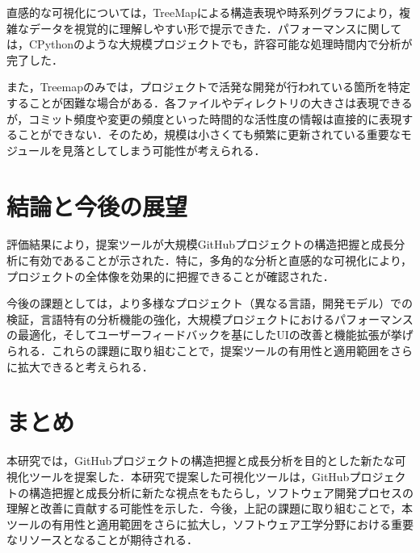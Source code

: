 \documentclass[12pt,twoside]{jbook}
\begin{document}
直感的な可視化については，TreeMapによる構造表現や時系列グラフにより，複雑なデータを視覚的に理解しやすい形で提示できた．パフォーマンスに関しては，CPythonのような大規模プロジェクトでも，許容可能な処理時間内で分析が完了した．

また，Treemapのみでは，プロジェクトで活発な開発が行われている箇所を特定することが困難な場合がある．各ファイルやディレクトリの大きさは表現できるが，コミット頻度や変更の頻度といった時間的な活性度の情報は直接的に表現することができない．そのため，規模は小さくても頻繁に更新されている重要なモジュールを見落としてしまう可能性が考えられる．

\chapter{結論と今後の展望}
評価結果により，提案ツールが大規模GitHubプロジェクトの構造把握と成長分析に有効であることが示された．特に，多角的な分析と直感的な可視化により，プロジェクトの全体像を効果的に把握できることが確認された．

今後の課題としては，より多様なプロジェクト（異なる言語，開発モデル）での検証，言語特有の分析機能の強化，大規模プロジェクトにおけるパフォーマンスの最適化，そしてユーザーフィードバックを基にしたUIの改善と機能拡張が挙げられる．これらの課題に取り組むことで，提案ツールの有用性と適用範囲をさらに拡大できると考えられる．

\chapter{まとめ}
本研究では，GitHubプロジェクトの構造把握と成長分析を目的とした新たな可視化ツールを提案した．本研究で提案した可視化ツールは，GitHubプロジェクトの構造把握と成長分析に新たな視点をもたらし，ソフトウェア開発プロセスの理解と改善に貢献する可能性を示した．今後，上記の課題に取り組むことで，本ツールの有用性と適用範囲をさらに拡大し，ソフトウェア工学分野における重要なリソースとなることが期待される．



%
%




\appendix
\end{document}

